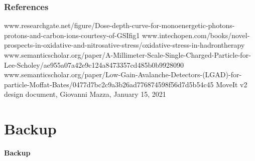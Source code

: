 \documentclass[aspectratio=169]{beamer}
\begin{document}
	\begin{frame}
	\frametitle{References}
	{\scriptsize 
	\begin{thebibliography}{00}
		www.researchgate.net/figure/Dose-depth-curve-for-monoenergetic-photons-protons-and-carbon-ions-courtesy-of-GSI\textunderscore fig1
		\newline
		www.intechopen.com/books/novel-prospects-in-oxidative-and-nitrosative-stress/oxidative-stress-in-hadrontherapy
		\newline
		www.semanticscholar.org/paper/A-Millimeter-Scale-Single-Charged-Particle-for-Lee-Scholey/ae955a07a42e9c124a8473357cd485b0b9928090
		\newline
		www.semanticscholar.org/paper/Low-Gain-Avalanche-Detectors-(LGAD)-for-particle-Moffat-Bates/0477d7bc2c9a3b26ad776874598f56d7d5b54c45
		\newline
		MoveIt v2 design document, Giovanni Mazza, January 15, 2021
	\end{thebibliography} }
	\end{frame}

	\section{Backup}
	
	\begin{frame}
	\begin{center}
		{\Huge {}\selectfont \color{blue} \textbf{Backup}}
	\end{center}
	\end{frame}
	
\end{document}
